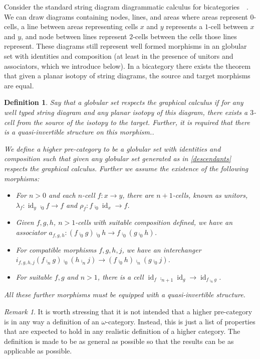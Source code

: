 \documentclass[draft]{article}
\newtheorem{definition}[theorem]{Definition} \theoremstyle{remark}
\newtheorem{remark}[theorem]{Remark} \newtheorem*{claim}{Claim}
\DeclareMathOperator{\id}{id}
\begin{document}
Consider the standard string diagram diagrammatic calculus for
bicategories~\cite{selinger2010survey}~\cite{heunen2019categories}. We
can draw diagrams containing nodes, lines, and areas where areas
represent \(0\)-cells, a line between areas representing cells \(x\)
and \(y\) represents a \(1\)-cell between \(x\) and \(y\), and node
between lines represent \(2\)-cells between the cells those lines
represent. These diagrams still represent well formed morphisms in an
globular set with identities and composition (at least in the presence
of unitors and associators, which we introduce below). In a bicategory
there exists the theorem that given a planar isotopy of string
diagrams, the source and target morphisms are equal.

\begin{definition}\label{def:higher-cat}
  Say that a globular set \emph{respects the graphical calculus} if
  for any well typed string diagram and any planar isotopy of this
  diagram, there exists a \(3\)-cell from the source of the isotopy to
  the target. Further, it is required that there is a quasi-invertible
  structure on this morphism..

  We define a \emph{higher pre-category} to be a globular set with
  identities and composition such that given any globular set
  generated as in \cref{descendants} respects the graphical calculus.
  Further we assume the existence of the following morphisms:
  \begin{itemize}
  \item For \(n>0\) and each \(n\)-cell \(f: x \to y\), there are
    \(n+1\)-cells, known as unitors, \(\lambda_f: \id_y \comp_0 f \to
    f\) and \(\rho_f: f \comp_0 \id_x \to f\).
  \item Given \(f,g,h\), \(n>1\)-cells with suitable composition
    defined, we have an associator \(a_{f,g,h} : (f \comp_0 g) \comp_0
    h \to f \comp_0 (g \comp_0 h)\).
  \item For compatible morphisms \(f,g,h,j\), we have an interchanger
    \(i_{f,g,h,j}(f \comp_n g) \comp_0 (h \comp_n j) \to (f \comp_0 h)
    \comp_n (g \comp_0 j)\).
  \item For suitable \(f,g\) and \(n > 1\), there is a cell \(\id_f
    \comp_{n+1} \id_g \to \id_{f \comp_n g}\).
  \end{itemize}
  All these further morphisms must be equipped with a quasi-invertible
  structure.
\end{definition}

\begin{remark}
  It is worth stressing that it is not intended that a higher
  pre-category is in any way a definition of an \(\omega\)-category.
  Instead, this is just a list of properties that are expected to hold
  in any realistic definition of a higher category. The definition is
  made to be as general as possible so that the results can be as
  applicable as possible.
\end{remark}
\end{document}
